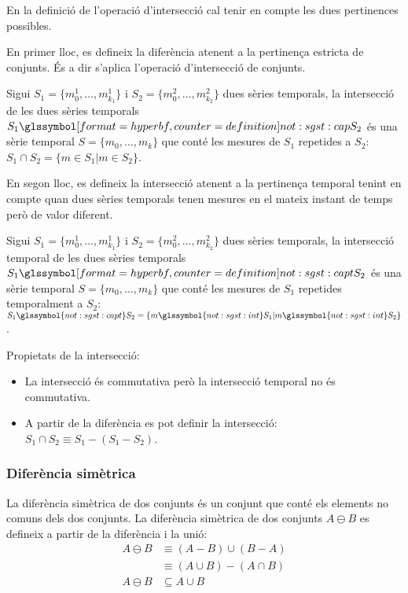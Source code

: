 En la definició de l'operació d'intersecció cal tenir en compte les
dues pertinences possibles.

En primer lloc, es defineix la diferència atenent a la pertinença
estricta de conjunts. És a dir s'aplica l'operació d'intersecció de
conjunts.
\begin{definition}[intersecció]
  Sigui $S_1=\{m_0^1, \dotsc, m_{k_1}^1\}$ i $S_2=\{m_0^2, \dotsc,
  m_{k_2}^2\}$ dues sèries temporals, la intersecció de les dues
  sèries temporals $S_1 \glssymboldef{not:sgst:cap} S_2$ és una sèrie
  temporal $S=\{m_0, \dotsc, m_k\}$ que conté les mesures de $S_1$
  repetides a $S_2$: $S_1 \cap S_2 = \{ m \in S_1 | m \in S_2 \}$.
\end{definition}

En segon lloc, es defineix la intersecció atenent a la pertinença
temporal tenint en compte quan dues sèries temporals tenen mesures en
el mateix instant de temps però de valor diferent.
\begin{definition}
  Sigui $S_1=\{m_0^1, \dotsc, m_{k_1}^1\}$ i $S_2=\{m_0^2, \dotsc,
  m_{k_2}^2\}$ dues sèries temporals, la intersecció temporal de les
  dues sèries temporals $S_1 \glssymboldef{not:sgst:capt} S_2$ és una
  sèrie temporal $S=\{m_0, \dotsc, m_k\}$ que conté les mesures de
  $S_1$ repetides temporalment a $S_2$: $S_1 \glssymbol{not:sgst:capt}
  S_2 = \{ m \glssymbol{not:sgst:int} S_1 | m \glssymbol{not:sgst:int} S_2 \}$.
\end{definition}

Propietats de la intersecció:
\begin{itemize}
\item La intersecció és commutativa però la intersecció temporal no és
  commutativa.
\item A partir de la diferència es pot definir la intersecció: $S_1
  \cap S_2 \equiv S_1 - (S_1 - S_2)$.
\end{itemize}


\subsubsection{Diferència simètrica}

La diferència simètrica de dos conjunts és un conjunt que conté els
elements no comuns dels dos conjunts. La diferència simètrica de dos
conjunts $A \ominus B$ es defineix a partir de la diferència i la
unió:
\begin{align*}
A \ominus B  & \equiv (A-B)\cup(B-A)\\
             & \equiv (A\cup B)-(A\cap B)  \\
A \ominus B  & \subseteq A\cup B
\end{align*}

